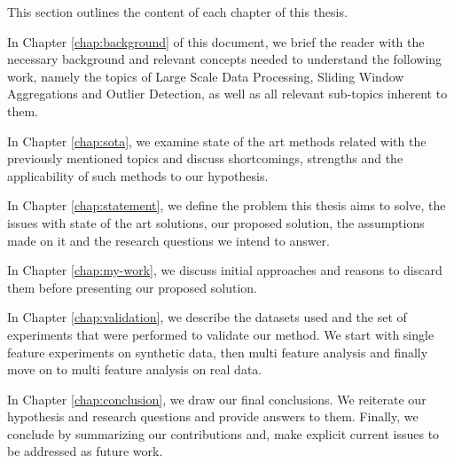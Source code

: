This section outlines the content of each chapter of this thesis.

In Chapter \ref{chap:background} of this document, we brief the reader with the necessary background and relevant concepts needed to understand the following work, namely the topics of Large Scale Data Processing, Sliding Window Aggregations and Outlier Detection, as well as all relevant sub-topics inherent to them. 

In Chapter \ref{chap:sota}, we examine state of the art methods related with the previously mentioned topics and discuss shortcomings, strengths and the applicability of such methods to our hypothesis.

In Chapter \ref{chap:statement}, we define the problem this thesis aims to solve, the issues with state of the art solutions, our proposed solution, the assumptions made on it and the research questions we intend to answer.

In Chapter \ref{chap:my-work}, we discuss initial approaches and reasons to discard them before presenting our proposed solution.

In Chapter \ref{chap:validation}, we describe the datasets used and the set of experiments that were performed to validate our method. We start with single feature experiments on synthetic data, then multi feature analysis and finally move on to multi feature analysis on real data.

In Chapter \ref{chap:conclusion}, we draw our final conclusions. We reiterate our hypothesis and research questions and provide answers to them. Finally, we conclude by summarizing our contributions and, make explicit current issues to be addressed as future work.
